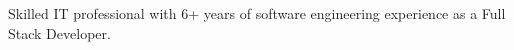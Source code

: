 \documentclass[letter,10pt]{article}
\begin{document}

Skilled IT professional with 6+ years of software engineering experience as a Full Stack Developer.
\end{document}
